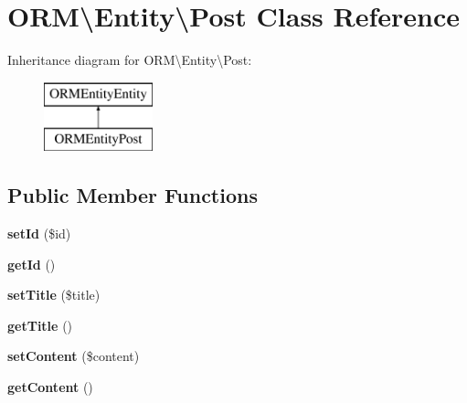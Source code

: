 \hypertarget{classORM_1_1Entity_1_1Post}{}\section{O\+RM\textbackslash{}Entity\textbackslash{}Post Class Reference}
\label{classORM_1_1Entity_1_1Post}
Inheritance diagram for O\+RM\textbackslash{}Entity\textbackslash{}Post\+:\begin{figure}[H]
\begin{center}
\leavevmode
\includegraphics[height=2.000000cm]{classORM_1_1Entity_1_1Post}
\end{center}
\end{figure}
\subsection*{Public Member Functions}
\begin{DoxyCompactItemize}
\item 
{\bfseries set\+Id} (\$id)\hypertarget{classORM_1_1Entity_1_1Post_aac5ab59a4b73b107e5acdae2ec4bf9f5}{}\label{classORM_1_1Entity_1_1Post_aac5ab59a4b73b107e5acdae2ec4bf9f5}

\item 
{\bfseries get\+Id} ()\hypertarget{classORM_1_1Entity_1_1Post_af28422f77735e94d200c12ff9bf4b45b}{}\label{classORM_1_1Entity_1_1Post_af28422f77735e94d200c12ff9bf4b45b}

\item 
{\bfseries set\+Title} (\$title)\hypertarget{classORM_1_1Entity_1_1Post_a5fc1167b1cd76d355ddd0d0828379b34}{}\label{classORM_1_1Entity_1_1Post_a5fc1167b1cd76d355ddd0d0828379b34}

\item 
{\bfseries get\+Title} ()\hypertarget{classORM_1_1Entity_1_1Post_a9e149fe1680157db50a8937be4395610}{}\label{classORM_1_1Entity_1_1Post_a9e149fe1680157db50a8937be4395610}

\item 
{\bfseries set\+Content} (\$content)\hypertarget{classORM_1_1Entity_1_1Post_aa170fe8b65c57e6b75e966f72c33c6de}{}\label{classORM_1_1Entity_1_1Post_aa170fe8b65c57e6b75e966f72c33c6de}

\item 
{\bfseries get\+Content} ()\hypertarget{classORM_1_1Entity_1_1Post_a208c2b207ee804515f26512edb9edab8}{}\label{classORM_1_1Entity_1_1Post_a208c2b207ee804515f26512edb9edab8}

\end{DoxyCompactItemize}
